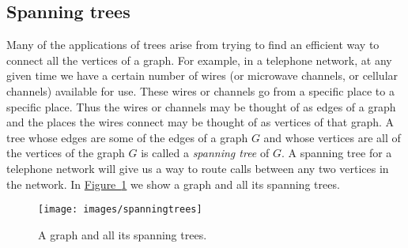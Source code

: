 \documentclass[10pt,]{book}
\theoremstyle{plain}
\theoremstyle{definition}
\numberwithin{equation}{chapter}
\begin{document}
\subsection[{Spanning trees}]{Spanning trees}\label{subsection-24}
Many of the applications of trees arise from trying to find an efficient way to connect all the vertices of a graph. For example, in a telephone network, at any given time we have a certain number of wires (or microwave channels, or cellular channels) available for use. These wires or channels go from a specific place to a specific place. Thus the wires or channels may be thought of as edges of a graph and the places the wires connect may be thought of as vertices of that graph. A tree whose edges are some of the edges of a graph \(G\) and whose vertices are all of the vertices of the graph \(G\) is called a \emph{spanning tree} of \(G\). A spanning tree for a telephone network will give us a way to route calls between any two vertices in the network. In \hyperref[spanningtrees]{Figure~\ref{spanningtrees}} we show a graph and all its spanning trees.%
\begin{figure}
\centering
\texttt{[image: images/spanningtrees]}
\caption{A graph and all its spanning trees.\label{spanningtrees}}
\end{figure}
\end{document}
